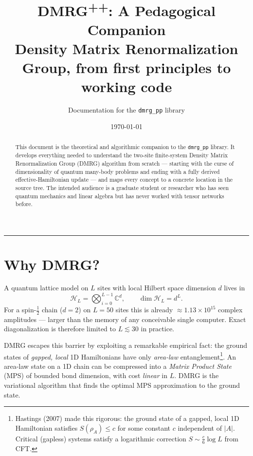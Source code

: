 \documentclass[11pt,a4paper]{article}
\title{\bfseries DMRG\textsuperscript{++}: A Pedagogical Companion\\
{\large Density Matrix Renormalization Group, from first principles to working code}}
\author{Documentation for the \texttt{dmrg\_pp} library}
\date{\today}
\theoremstyle{plain}
\theoremstyle{definition}
\theoremstyle{remark}
\newcommand{\C}{\mathbb{C}}
\newcommand{\Hilb}{\mathcal{H}}
\newcommand{\dphys}{d}
\begin{document}
\maketitle
\begin{abstract}
\noindent
This document is the theoretical and algorithmic companion to the
\texttt{dmrg\_pp} library.  It develops everything needed to understand the
two-site finite-system Density Matrix Renormalization Group (DMRG) algorithm
from scratch --- starting with the curse of dimensionality of quantum many-body
problems and ending with a fully derived effective-Hamiltonian update --- and
maps every concept to a concrete location in the source tree.  The intended
audience is a graduate student or researcher who has seen quantum mechanics and
linear algebra but has never worked with tensor networks before.
\end{abstract}

\tableofcontents
\bigskip\hrule\bigskip


\section{Why DMRG?}
\label{sec:why}

A quantum lattice model on $L$ sites with local Hilbert space dimension
$\dphys$ lives in
\begin{equation}
  \Hilb_L = \bigotimes_{i=0}^{L-1} \C^{\dphys}, \qquad
  \dim \Hilb_L = \dphys^{L}.
\end{equation}
For a spin-$\tfrac12$ chain ($\dphys=2$) on $L=50$ sites this is already
$\approx 1.13\times 10^{15}$ complex amplitudes --- larger than the memory of
any conceivable single computer.  Exact diagonalization is therefore limited
to $L \lesssim 30$ in practice.

DMRG escapes this barrier by exploiting a remarkable empirical fact: the
ground states of \emph{gapped, local} 1D Hamiltonians have only \emph{area-law}
entanglement\footnote{Hastings (2007) made this rigorous: the ground state of
a gapped, local 1D Hamiltonian satisfies $S(\rho_A) \le c$ for some constant
$c$ independent of $|A|$.  Critical (gapless) systems satisfy a logarithmic
correction $S \sim \tfrac{c}{6}\log L$ from CFT.}.  An area-law state on a 1D
chain can be compressed into a \emph{Matrix Product State} (MPS) of bounded
bond dimension, with cost \emph{linear} in $L$.  DMRG is the variational
algorithm that finds the optimal MPS approximation to the ground state.
\end{document}
